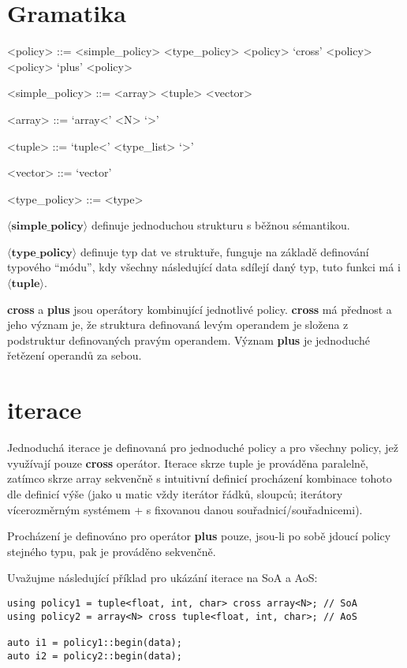 \documentclass[a4paper,12pt]{article} %
\begin{document}
    \section{Gramatika}

    \begin{grammar}
        <policy> ::= <simple_policy>
        \alt <type_policy>
        \alt <policy> `cross' <policy>
        \alt <policy> `plus' <policy>

        <simple_policy> ::= <array>
        \alt <tuple>
        \alt <vector>

        <array> ::= `array<' <N> `>'

        <tuple> ::= `tuple<' <type_list> `>'

        <vector> ::= `vector'

        <type_policy> ::= <type>
    \end{grammar}

    $\mathbf{\langle simple\_policy \rangle}$ definuje jednoduchou strukturu s běžnou sémantikou.

    $\mathbf{\langle type\_policy \rangle}$ definuje typ dat ve struktuře, funguje na základě definování typového ``módu'', kdy všechny následující data sdílejí daný typ, tuto funkci má i $\mathbf{\langle tuple \rangle}$.

    \textbf{cross} a \textbf{plus} jsou operátory kombinující jednotlivé policy.
    \textbf{cross} má přednost a jeho význam je, že struktura definovaná levým operandem je složena z podstruktur definovaných pravým operandem. Význam \textbf{plus} je jednoduché řetězení operandů za sebou.

    \section{iterace}

    Jednoduchá iterace je definovaná pro jednoduché policy a pro všechny policy, jež využívají pouze \textbf{cross} operátor. Iterace skrze tuple je prováděna paralelně, zatímco skrze array sekvenčně s intuitivní definicí procházení kombinace tohoto dle definicí výše (jako u matic vždy iterátor řádků, sloupců; iterátory vícerozměrným systémem + s fixovanou danou souřadnicí/souřadnicemi).

    Procházení je definováno pro operátor \textbf{plus} pouze, jsou-li po sobě jdoucí policy stejného typu, pak je prováděno sekvenčně.

    Uvažujme následující příklad pro ukázání iterace na SoA a AoS:
    \begin{lstlisting}
using policy1 = tuple<float, int, char> cross array<N>; // SoA
using policy2 = array<N> cross tuple<float, int, char>; // AoS

auto i1 = policy1::begin(data);
auto i2 = policy2::begin(data);
    \end{lstlisting}
\end{document}

